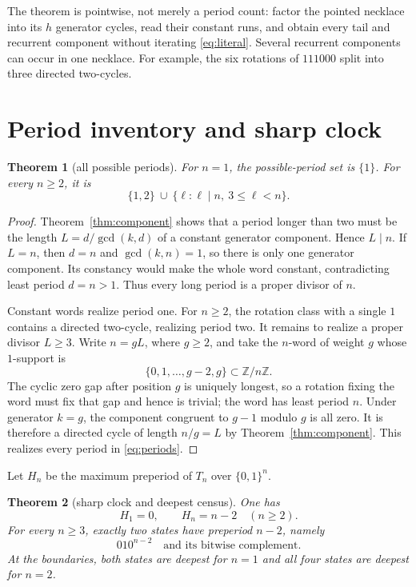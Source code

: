 \documentclass[a4paper,10pt]{amsart}
\newtheorem{theorem}{Theorem}[section]
\theoremstyle{remark}
\newcommand{\Z}{\mathbb Z}
\newcommand{\F}{\{0,1\}}
\newcommand{\1}{\mathbf 1}
\begin{document}
The theorem is pointwise, not merely a period count: factor the pointed
necklace into its $h$ generator cycles, read their constant runs, and obtain
every tail and recurrent component without iterating \eqref{eq:literal}.
Several recurrent components can occur in one necklace.  For example, the
six rotations of $111000$ split into three directed two-cycles.

\section{Period inventory and sharp clock}

\begin{theorem}[all possible periods]\label{thm:periods}
For $n=1$, the possible-period set is $\{1\}$.  For every $n\geq2$, it is
\begin{equation}\label{eq:periods}
 \{1,2\}\ \cup\ \{\ell:\ell\mid n,\ 3\leq\ell<n\}.
\end{equation}
\end{theorem}

\begin{proof}
Theorem~\ref{thm:component} shows that a period longer than two must be the
length $L=d/\gcd(k,d)$ of a constant generator component.  Hence $L\mid n$.
If $L=n$, then $d=n$ and $\gcd(k,n)=1$, so there is only one generator
component.  Its constancy would make the whole word constant, contradicting
least period $d=n>1$.  Thus every long period is a proper divisor of $n$.

Constant words realize period one.  For $n\geq2$, the rotation class with a
single $1$ contains a directed two-cycle, realizing period two.  It remains
to realize a proper divisor $L\geq3$.  Write $n=gL$, where $g\geq2$, and
take the $n$-word of weight $g$ whose $1$-support is
\begin{equation}\label{eq:witnesssupport}
 \{0,1,\ldots,g-2,g\}\subset\Z/n\Z.
\end{equation}
The cyclic zero gap after position $g$ is uniquely longest, so a rotation
fixing the word must fix that gap and hence is trivial; the word has least
period $n$.  Under generator $k=g$, the component congruent to $g-1$ modulo
$g$ is all zero.  It is therefore a directed cycle of length $n/g=L$ by
Theorem~\ref{thm:component}.  This realizes every period in
\eqref{eq:periods}.
\end{proof}

Let $H_n$ be the maximum preperiod of $T_n$ over $\F^n$.

\begin{theorem}[sharp clock and deepest census]\label{thm:clock}
One has
\begin{equation}\label{eq:clock}
 H_1=0,\qquad H_n=n-2\quad(n\geq2).
\end{equation}
For every $n\geq3$, exactly two states have preperiod $n-2$, namely
\begin{equation}\label{eq:deepest}
 010^{n-2}\quad\text{and its bitwise complement}.
\end{equation}
At the boundaries, both states are deepest for $n=1$ and all four states
are deepest for $n=2$.
\end{theorem}
\end{document}
